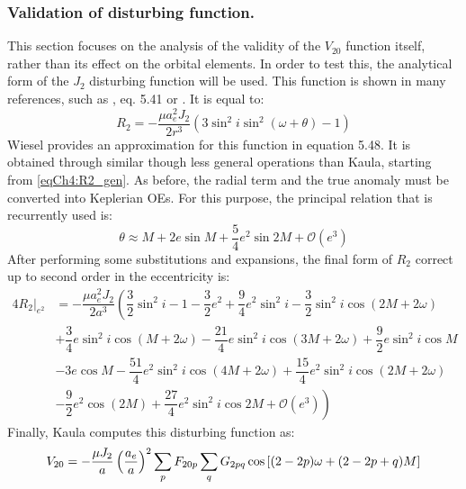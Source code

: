 			\subsubsection{Validation of disturbing function.}
			\indent This section focuses on the analysis of the validity of the $V_{20}$ function itself, rather than its effect on the orbital elements. In order to test this, the analytical form of the $J_2$ disturbing function will be used. This function is shown in many references, such as \cite{Wiesel}, eq. 5.41 or \cite{Brouwer}. It is equal to:
			\begin{equation}
			R_2 = - \dfrac{\mu a_e^2 J_2}{2 r^3} \left(3\sin^2 i \sin^2 (\omega + \theta) - 1 \right)
			\label{eqCh4:R2_gen}
			\end{equation}
			\indent Wiesel \cite{Wiesel} provides an approximation for this function in equation 5.48. It is obtained through similar though less general operations than Kaula, starting from \eqref{eqCh4:R2_gen}. As before, the radial term and the true anomaly must be converted into Keplerian OEs. For this purpose, the principal relation that is recurrently used is:
			\begin{equation}
			\theta \approx M + 2e\sin M + \dfrac{5}{4}e^2\sin 2M + \mathcal{O}(e^3)
			\end{equation} 
			\indent After performing some substitutions and expansions, the final form of $R_2$ correct up to second order in the eccentricity is:
			\begin{alignat}{4}
			\nonumber \left. R_2\right\rvert_{e^2} & = - \dfrac{\mu a_e^2 J_2}{2 a^3} \left( \dfrac{3}{2} \sin^2 i - 1 - \dfrac{3}{2} e^2 + \dfrac{9}{4} e^2\sin^2 i - \dfrac{3}{2} \sin^2 i \cos(2M + 2\omega) \right.\\
			\nonumber 	&  + \dfrac{3}{4} e \sin^2 i \cos(M + 2\omega) - \dfrac{21}{4}e \sin^2 i \cos(3M + 2\omega) + \dfrac{9}{2} e\sin^2 i \cos M\\
			\nonumber 	& - 3e \cos M - \dfrac{51}{4} e^2 \sin^2 i \cos(4M + 2 \omega) + \dfrac{15}{4}e^2 \sin^2 i \cos(2M + 2\omega)\\
			\label{eqCh4:R2_wiesel}		&  \left. - \dfrac{9}{2} e^2 \cos(2M) + \dfrac{27}{4}e^2  \sin^2 i \cos 2M + \mathcal{O}(e^3) \right)						
			\end{alignat}
			\indent Finally, Kaula computes this disturbing function as:
			\begin{equation}
			V_{20} = -\dfrac{\mu J_2}{a} \left( \dfrac{a_e}{a} \right)^2 \displaystyle\sum_{p} F_{20p} \displaystyle\sum_{q} G_{2pq} \cos\left[ (2 - 2p)\omega + (2 - 2p + q)M \right]
			\label{eqCh4:V20_kaula}
			\end{equation}
